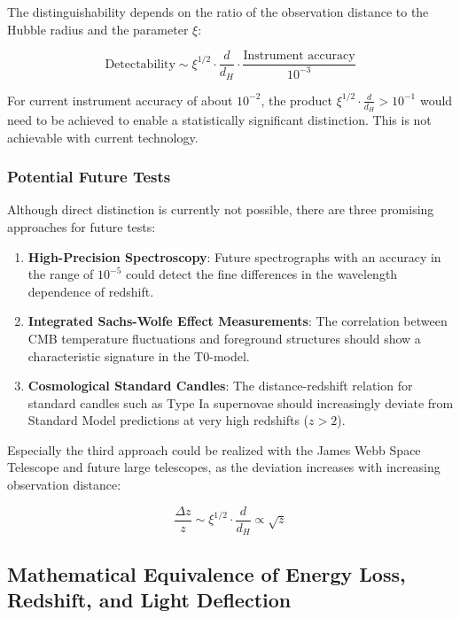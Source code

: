 \documentclass[12pt,a4paper]{article}
\theoremstyle{definition}
\begin{document}
	\begin{verhaltnis}
		The distinguishability depends on the ratio of the observation distance to the Hubble radius and the parameter $\xi$:
		
		\begin{equation}
			\text{Detectability} \sim \xi^{1/2} \cdot \frac{d}{d_H} \cdot \frac{\text{Instrument accuracy}}{10^{-3}}
		\end{equation}
		
		For current instrument accuracy of about $10^{-2}$, the product $\xi^{1/2} \cdot \frac{d}{d_H} > 10^{-1}$ would need to be achieved to enable a statistically significant distinction. This is not achievable with current technology.
	\end{verhaltnis}
	
	\subsubsection{Potential Future Tests}
	
	Although direct distinction is currently not possible, there are three promising approaches for future tests:
	
	\begin{enumerate}
		\item \textbf{High-Precision Spectroscopy}: Future spectrographs with an accuracy in the range of $10^{-5}$ could detect the fine differences in the wavelength dependence of redshift.
		
		\item \textbf{Integrated Sachs-Wolfe Effect Measurements}: The correlation between CMB temperature fluctuations and foreground structures should show a characteristic signature in the T0-model.
		
		\item \textbf{Cosmological Standard Candles}: The distance-redshift relation for standard candles such as Type Ia supernovae should increasingly deviate from Standard Model predictions at very high redshifts ($z > 2$).
	\end{enumerate}
	
	Especially the third approach could be realized with the James Webb Space Telescope and future large telescopes, as the deviation increases with increasing observation distance:
	
	\begin{equation}
		\frac{\Delta z}{z} \sim \xi^{1/2} \cdot \frac{d}{d_H} \propto \sqrt{z}
	\end{equation}\subsection{Mathematical Equivalence of Energy Loss, Redshift, and Light Deflection}
	
\end{document}
